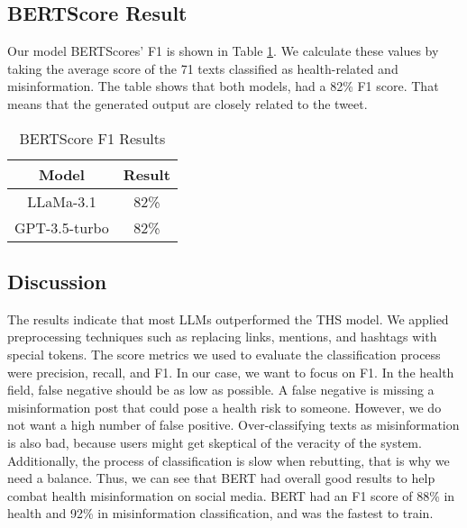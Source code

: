 \subsection{BERTScore Result}

Our model BERTScores'  F1 is shown in Table \ref{table:BERTScore}. We calculate these values by taking the average score of the 71 texts classified as health-related and misinformation. The table shows that both models, had a 82\% F1 score. That means that the generated output are closely related to the tweet. 

\begin{table}[H]
	\centering
	\caption{BERTScore F1 Results}
	{\footnotesize
	\begin{tabular}{||c | c||} 
		\hline
		\textbf{Model} & \textbf{Result} \\  
		\hline
		LLaMa-3.1 & 82\%  \\
		\hline
		GPT-3.5-turbo & 82\% \\ 		
		\hline
		\end{tabular}
	}
	\label{table:BERTScore}
\end{table}

\subsection{Discussion}

The results indicate that most LLMs outperformed the THS model. We applied preprocessing techniques such as replacing links, mentions, and hashtags with special tokens.
The score metrics we used to evaluate the classification process were precision, recall, and F1. In our case, we want to focus on F1. In the health field, false negative should be
as low as possible. A false negative is missing a misinformation post that could pose a health risk to someone. However, we do not want a high number of false positive. Over-classifying 
texts as misinformation is also bad, because users might get skeptical of the veracity of the system. Additionally, the process of classification is slow when rebutting, that is why we need a balance.
Thus, we can see that BERT had overall good results to help combat
health misinformation on social media. BERT had an F1 score of 88\% in health and 92\% in misinformation classification, and was the fastest  to train.


